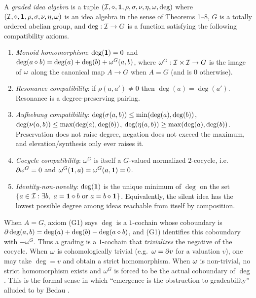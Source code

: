 \begin{definition}\label{def:graded-idea-alg}
A \emph{graded idea algebra} is a tuple
$(\mathcal{I},\mathbin{\diamond},\mathbf{1},\rho,\sigma,\nu,\eta,\omega,\deg)$
where $(\mathcal{I},\mathbin{\diamond},\mathbf{1},\rho,\sigma,\nu,\eta,\omega)$
is an idea algebra in the sense of Theorems 1--8, $G$ is a totally
ordered abelian group, and $\deg : \mathcal{I} \to G$ is a function
satisfying the following compatibility axioms.
\begin{enumerate}
\item[\textbf{(G1)}] \emph{Monoid homomorphism}:
  $\deg(\mathbf{1}) = 0$ and
  $\deg(a\mathbin{\diamond} b) = \deg(a) + \deg(b) + \omega^G(a,b)$,
  where $\omega^G : \mathcal{I}\times\mathcal{I} \to G$ is the image of $\omega$
  along the canonical map $A \to G$ when $A=G$ (and is $0$ otherwise).
\item[\textbf{(G2)}] \emph{Resonance compatibility}: if $\rho(a,a') \neq
  0$ then $\deg(a) = \deg(a')$. Resonance is a degree-preserving
  pairing.
\item[\textbf{(G3)}] \emph{Aufhebung compatibility}:
  $\deg(\sigma(a,b)) \le \min(\deg(a),\deg(b))$,
  $\deg(\nu(a,b))   \le \max(\deg(a),\deg(b))$,
  $\deg(\eta(a,b))  \ge \max(\deg(a),\deg(b))$.
  Preservation does not raise degree, negation does not exceed the
  maximum, and elevation/synthesis only ever raises it.
\item[\textbf{(G4)}] \emph{Cocycle compatibility}: $\omega^G$ is itself a
  $G$-valued normalized $2$-cocycle, i.e.\ $\partial \omega^G = 0$ and
  $\omega^G(\mathbf{1},a) = \omega^G(a,\mathbf{1}) = 0$.
\item[\textbf{(G5)}] \emph{Identity-non-novelty}: $\deg(\mathbf{1})$ is the
  unique minimum of $\deg$ on the set
  $\{a\in\mathcal{I} : \exists b,\ a = \mathbf{1}\mathbin{\diamond} b \text{ or } a =
  b\mathbin{\diamond} \mathbf{1}\}$. Equivalently, the silent idea has the lowest
  possible degree among ideas reachable from itself by composition.
\end{enumerate}
\end{definition}

\begin{remark}
When $A=G$, axiom (G1) says $\deg$ is a $1$-cochain whose coboundary is
$\partial \deg(a,b) = \deg(a) + \deg(b) - \deg(a\mathbin{\diamond} b)$, and (G1)
identifies this coboundary with $-\omega^G$. Thus a grading is a
$1$-cochain that \emph{trivializes} the negative of the cocycle. When
$\omega$ is cohomologically trivial (e.g.\ $\omega=\partial v$ for a
valuation $v$), one may take $\deg = v$ and obtain a strict
homomorphism. When $\omega$ is non-trivial, no strict homomorphism
exists and $\omega^G$ is forced to be the actual coboundary of $\deg$.
This is the formal sense in which ``emergence is the obstruction to
gradeability'' alluded to by Bedau \cite{Bedau1997}.
\end{remark}

